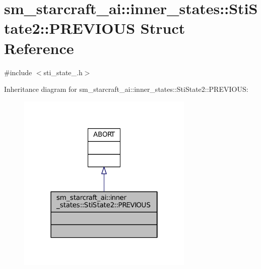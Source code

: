 \hypertarget{structsm__starcraft__ai_1_1inner__states_1_1StiState2_1_1PREVIOUS}{}\section{sm\+\_\+starcraft\+\_\+ai\+:\+:inner\+\_\+states\+:\+:Sti\+State2\+:\+:P\+R\+E\+V\+I\+O\+US Struct Reference}
\label{structsm__starcraft__ai_1_1inner__states_1_1StiState2_1_1PREVIOUS}


{\ttfamily \#include $<$sti\+\_\+state\+\_.\+h$>$}



Inheritance diagram for sm\+\_\+starcraft\+\_\+ai\+:\+:inner\+\_\+states\+:\+:Sti\+State2\+:\+:P\+R\+E\+V\+I\+O\+US\+:
\nopagebreak
\begin{figure}[H]
\begin{center}
\leavevmode
\includegraphics[width=238pt]{structsm__starcraft__ai_1_1inner__states_1_1StiState2_1_1PREVIOUS__inherit__graph}
\end{center}
\end{figure}



